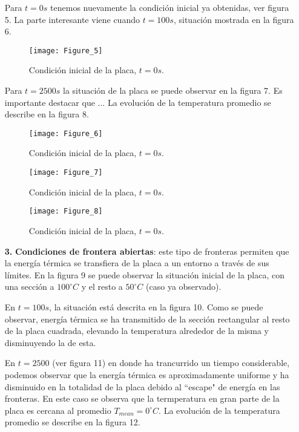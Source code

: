 \documentclass{article}
\begin{document}
\begin{itemize}
Para $t=0s$ tenemos nuevamente la condici\'on inicial ya obtenidas, ver figura 5. La parte interesante viene cuando $t=100 s$, situaci\'on mostrada en la figura 6.

\begin{figure}
\begin{center}
\texttt{[image: Figure\_5]}
\end{center}
\caption{Condici\'on inicial de la placa, $t = 0 s$.}
\end{figure}

Para $t = 2500 s$ la situaci\'on de la placa se puede observar en la figura 7. Es importante destacar que ... La evoluci\'on  de la temperatura promedio se describe en la figura 8.

\begin{figure}
\begin{center}
\texttt{[image: Figure\_6]}
\end{center}
\caption{Condici\'on inicial de la placa, $t = 0 s$.}
\end{figure}

\begin{figure}
\begin{center}
\texttt{[image: Figure\_7]}
\end{center}
\caption{Condici\'on inicial de la placa, $t = 0 s$.}
\end{figure}

\begin{figure}
\begin{center}
\texttt{[image: Figure\_8]}
\end{center}
\caption{Condici\'on inicial de la placa, $t = 0 s$.}
\end{figure}

\item[\textbf{3.}] \textbf{Condiciones de frontera abiertas}: este tipo de fronteras permiten que la energ\'ia t\'ermica se transfiera de la placa a un entorno a trav\'es de sus l\'imites. En la figura 9 se puede observar la situaci\'on inicial de la placa, con una secci\'on a $100^{\circ} C$ y el resto a $50^{\circ}C$ (caso ya observado).

En $t = 100 s$, la situaci\'on est\'a descrita en la figura 10. Como se puede observar,  energ\'ia t\'ermica se ha transmitido de la secci\'on rectangular al resto de la placa cuadrada, elevando la temperatura alrededor de la misma y disminuyendo la de esta.

En $t = 2500$ (ver figura 11) en donde ha trancurrido un tiempo considerable, podemos observar que la energ\'ia t\'ermica es aproximadamente uniforme y ha disminuido en la totalidad de la placa debido al ``escape" de energ\'ia en las fronteras. En este caso se observa que la termperatura  en gran parte de la placa es cercana al promedio $T_{mean} = 0 ^{\circ} C$. La evoluci\'on  de la temperatura promedio se describe en la figura 12.


\end{itemize}
\end{document}

